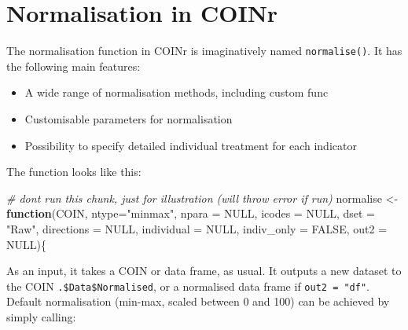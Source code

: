 \documentclass[
]{book}
\newenvironment{Shaded}{\begin{snugshade}}{\end{snugshade}}
\newcommand{\AttributeTok}[1]{\textcolor[rgb]{0.77,0.63,0.00}{#1}}
\newcommand{\CommentTok}[1]{\textcolor[rgb]{0.56,0.35,0.01}{\textit{#1}}}
\newcommand{\ConstantTok}[1]{\textcolor[rgb]{0.00,0.00,0.00}{#1}}
\newcommand{\ControlFlowTok}[1]{\textcolor[rgb]{0.13,0.29,0.53}{\textbf{#1}}}
\newcommand{\NormalTok}[1]{#1}
\newcommand{\OtherTok}[1]{\textcolor[rgb]{0.56,0.35,0.01}{#1}}
\newcommand{\StringTok}[1]{\textcolor[rgb]{0.31,0.60,0.02}{#1}}
\providecommand{\tightlist}{%
  \setlength{\itemsep}{0pt}\setlength{\parskip}{0pt}}
\begin{document}
\hypertarget{normalisation-in-coinr}{%
\section{Normalisation in COINr}\label{normalisation-in-coinr}}

The normalisation function in COINr is imaginatively named \texttt{normalise()}. It has the following main features:

\begin{itemize}
\tightlist
\item
  A wide range of normalisation methods, including custom func
\item
  Customisable parameters for normalisation
\item
  Possibility to specify detailed individual treatment for each indicator
\end{itemize}

The function looks like this:

\begin{Shaded}
\begin{Highlighting}[]
\CommentTok{\# don\textquotesingle{}t run this chunk, just for illustration (will throw error if run)}
\NormalTok{normalise }\OtherTok{\textless{}{-}} \ControlFlowTok{function}\NormalTok{(COIN, }\AttributeTok{ntype=}\StringTok{"minmax"}\NormalTok{, }\AttributeTok{npara =} \ConstantTok{NULL}\NormalTok{, }\AttributeTok{icodes =} \ConstantTok{NULL}\NormalTok{,}
                      \AttributeTok{dset =} \StringTok{"Raw"}\NormalTok{, }\AttributeTok{directions =} \ConstantTok{NULL}\NormalTok{, }\AttributeTok{individual =} \ConstantTok{NULL}\NormalTok{,}
                      \AttributeTok{indiv\_only =} \ConstantTok{FALSE}\NormalTok{, }\AttributeTok{out2 =} \ConstantTok{NULL}\NormalTok{)\{}
\end{Highlighting}
\end{Shaded}

As an input, it takes a COIN or data frame, as usual. It outputs a new dataset to the COIN \texttt{.\$Data\$Normalised}, or a normalised data frame if \texttt{out2\ =\ "df"}. Default normalisation (min-max, scaled between 0 and 100) can be achieved by simply calling:
\end{document}
